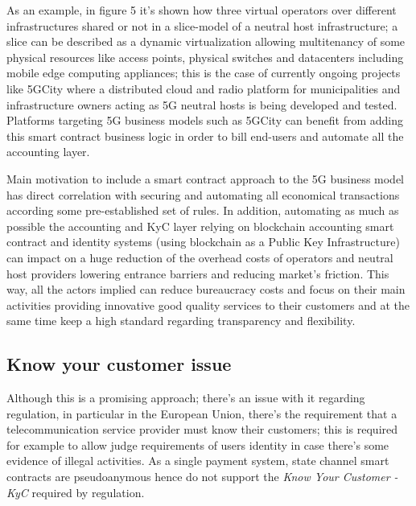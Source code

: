\documentclass[12pt]{amsart}
\begin{document}
\begin{multicols}{2}

As an example, in figure 5 it's shown how three virtual operators over
different infrastructures shared or not in a slice-model of a neutral host
infrastructure; a slice can be described as a dynamic virtualization
allowing multitenancy of some physical resources like access points,
physical switches and datacenters including mobile edge computing
appliances; this is the case of currently ongoing projects like
5GCity\cite{5gcity} where a distributed cloud
and radio platform for municipalities and infrastructure owners acting
as 5G neutral hosts is being developed and tested. Platforms
targeting 5G business models such as 5GCity can benefit from adding
this smart contract business logic in order to bill end-users and automate
all the accounting layer.

\vspace{0.35cm}

Main motivation to include a smart contract approach to the 5G
business model has direct correlation with securing and
automating all economical transactions according some pre-established
set of rules. In addition, automating as much as possible the
accounting and KyC layer relying on blockchain accounting smart
contract and identity systems (using blockchain as a Public Key
Infrastructure) can impact on a huge reduction of the overhead costs
of operators and neutral host providers lowering entrance barriers and
reducing market's friction.  This way, all the actors implied can
reduce bureaucracy costs and focus on their main activities providing
innovative good quality services to their customers and at the same
time keep a high standard regarding transparency and flexibility.

\subsection{Know your customer issue}

\vspace{0.35cm}

Although this is a promising approach; there's an issue with it regarding
regulation, in particular in the European Union, there's the requirement
that a telecommunication service provider must know their customers; this
is required for example to allow judge requirements of users identity
in case there's some evidence of illegal activities. As a single payment
system, state channel smart contracts are pseudoanymous hence do not
support the \textit{Know Your Customer - KyC} required by regulation.


\end{multicols}
\end{document}
